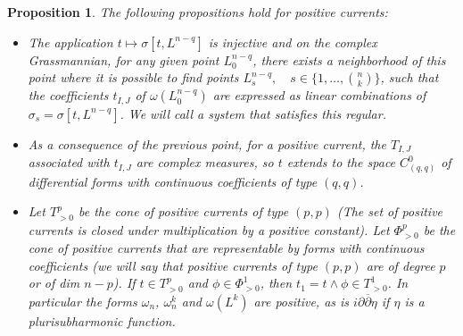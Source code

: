 \documentclass[12pt,twoside,a4paper]{report}
\newtheorem{prop}[theorem]{Proposition}
\begin{document}
\begin{prop}
The following propositions hold for positive currents:
    \begin{itemize}
        \item[1] The application $t\mapsto\sigma[t,L^{n-q}]$ is injective and on the complex Grassmannian, for any given point $L^{n-q}_{0}$, there exists a neighborhood of this point where it is possible to find points $L^{n-q}_s,\quad s\in\{1,\dots,{n\choose k}\}$, such that the coefficients $t_{I,J}$ of $\omega(L^{n-q}_{0})$ are expressed as linear combinations of $\sigma_s=\sigma[t,L^{n-q}]$. We will call a system that satisfies this \emph{regular}.

        \item[2] As a consequence of the previous point, for a positive current, the $T_{I,J}$ associated with $t_{I,J}$ are complex measures, so $t$ extends to the space $C^{0}_{(q,q)}$ of differential forms with continuous coefficients of type $(q,q)$.

        \item[3] Let $T_{>0}^{p}$ be the cone of positive currents of type $(p,p)$ (The set of positive currents is closed under multiplication by a positive constant). Let $\Phi^{p}_{>0}$ be the cone of positive currents that are representable by forms with continuous coefficients (we will say that positive currents of type $(p,p)$ are of degree $p$ or of dim $n-p$). If $t\in T^{p}_{>0}$ and $\phi\in\Phi^{1}_{>0}$, then $t_1=t\wedge\phi\in T^{1}_{>0}$. In particular the forms $\omega_n$, $\omega^{k}_n$ and $\omega(L^k)$ are positive, as is $i\partial\overline{\partial}\eta$ if $\eta$ is a plurisubharmonic function.


\end{itemize}
\end{prop}
\end{document}
